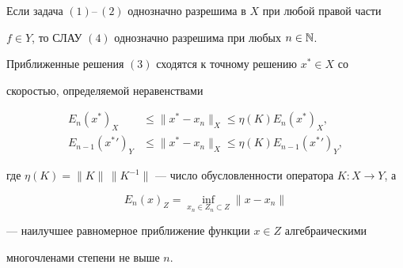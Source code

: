 \begin{thmnonum}


Если задача $(1)$--\,$(2)$ однозначно разрешима в $X$ при любой правой части 


$f\in Y$, то СЛАУ $(4)$ однозначно разрешима при любых $n\in\Bbb{N}$. 


Приближенные решения $(3)$ сходятся к точному решению $x^{*}\in X$ со 


скоростью, определяемой неравенствами


\begin{align}


E_{n}(x^{*})_{X}&\leq\|x^{*}-x_{n}\|_{X}\leq\eta(K)E_{n}(x^{*})_{X},\\


E_{n-1}(x^{*}{}')_{Y}&\leq\|x^{*}-x_{n}\|_{X}\leq\eta(K)E_{n-1}(x^{*}{}')_{Y},


\end{align}


где $\eta(K)=\|K\|\,\|K^{-1}\|$ --- число обусловленности оператора $K:X\to Y$, а 


$$


E_{n}(x)_{Z}=\inf\limits_{x_n\in Z_n\subset Z} \|x-x_n\|


$$


--- наилучшее  равномерное приближение функции $x\in Z$ алгебраическими 


многочленами степени не выше $n$.


\end{thmnonum} 








